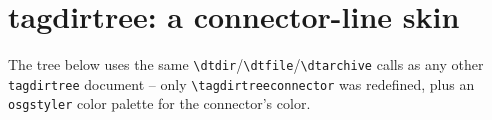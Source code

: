 \documentclass{article}
\begin{document}
\section*{tagdirtree: a connector-line skin}

The tree below uses the same \verb|\dtdir|/\verb|\dtfile|/\verb|\dtarchive|
calls as any other \texttt{tagdirtree} document -- only
\verb|\tagdirtreeconnector| was redefined, plus an \texttt{osgstyler} color
palette for the connector's color.

\begin{tagdirtree}
\end{tagdirtree}
\end{document}
